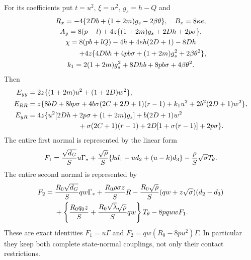 \documentclass[11pt]{article}
\begin{document}
For its coefficients put $t=u^2$, $\xi=w^2$, $g_s=h-Q$ and
\[
\begin{gathered}
 R_x=-4\{2Db+(1+2m)g_s-2\beta\theta\},\quad B_x=8\kappa e,\\
 A_y=8(p-l)+4z\{(1+2m)g_s+2Dh+2p\sigma\},\\
 \chi=8(pb+lQ)-4h+4eh(2D+1)-8Dh\\
 \hspace{12mm}+4z\{4Dbh+4pb\sigma+(1+2m)g_s^2+2\beta\theta^2\},\\
 k_1=2(1+2m)g_s^2+8Dhb+8pb\sigma+4\beta\theta^2.
\end{gathered}
\]
Then
\[
\begin{split}
 E_{yy}&=2z\{(1+2m)u^2+(1+2D)w^2\},\\
 E_{RR}&=z\{8bD+8bp\sigma+4b\sigma(2C+2D+1)(r-1)
                                  +k_1u^2+2b^2(2D+1)w^2\},\\
 E_{yR}&=4z\{u^2[2Dh+2p\sigma+(1+2m)g_s]+b(2D+1)w^2\\
 &\hspace{25mm}+\sigma(2C+1)(r-1)+2D[1+\sigma(r-1)]+2p\sigma\}.
\end{split}
\]
The entire first normal is represented by the linear form
\[
 F_1={\sqrt{d_G}\over S}u\Gamma_*
 +{\sqrt\rho\over S}\{kd_1-ud_2+(u-k)d_3\}
                         -{\rho\over S}\sqrt\sigma T_\theta.
\]
The entire second normal is represented by
\[
\begin{split}
 F_2={}&{R_0\sqrt{d_G}\over S}qw\Gamma_*
 +{R_0\rho\sigma z\over S}R
 -{R_0\sqrt\rho\over S}(qw+z\sqrt\sigma)(d_2-d_3)\\
 &+\left\{{R_0q_0z\over S}
       +{R_0\sqrt\lambda\sqrt\rho\over S}qw\right\}T_\theta
                                          -8pquwF_1.
\end{split}
\]
These are exact identities $F_1=u\Gamma$ and
$F_2=qw(R_0-8pu^2)\Gamma$. In particular they keep both complete
state-normal couplings, not only their contact restrictions.
\end{document}
